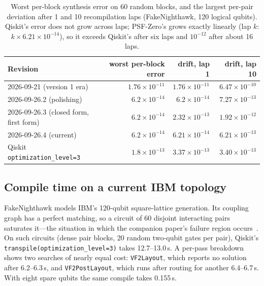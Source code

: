 \documentclass[11pt]{article}
\begin{document}
\begin{table}[h]
\centering
\begin{tabular}{lrrr}
\toprule
Revision & worst per-block error & drift, lap 1 & drift, lap 10 \\
\midrule
2026-09-21 (version 1 era) & $1.76\times10^{-11}$ & $1.76\times10^{-11}$ & $6.47\times10^{-10}$ \\
2026-09-26.2 (polishing) & $6.2\times10^{-14}$ & $6.2\times10^{-14}$ & $7.27\times10^{-13}$ \\
2026-09-26.3 (closed form, first form) & $6.2\times10^{-14}$ & $2.32\times10^{-13}$ & $1.92\times10^{-12}$ \\
2026-09-26.4 (current) & $6.2\times10^{-14}$ & $6.21\times10^{-14}$ & $6.21\times10^{-13}$ \\
Qiskit \texttt{optimization\_level=3} & $1.8\times10^{-13}$ & $3.37\times10^{-13}$ & $3.40\times10^{-13}$ \\
\bottomrule
\end{tabular}
\caption{Worst per-block synthesis error on 60 random blocks, and the
largest per-pair deviation after 1 and 10 recompilation laps (FakeNighthawk,
120 logical qubits). Qiskit's error does not grow across laps; PSF-Zero's
grows exactly linearly (lap $k$: $k\times6.21\times10^{-14}$), so it
exceeds Qiskit's after six laps and $10^{-12}$ after about 16 laps.}
\label{tab:drift}
\end{table}

\subsection{Compile time on a current IBM topology}
\label{sec:update-speed}

FakeNighthawk models IBM's 120-qubit square-lattice generation. Its
coupling graph has a perfect matching, so a circuit of 60 disjoint
interacting pairs saturates it---the situation in which the companion
paper's failure region occurs~\cite{vf2cliff}. On such circuits (dense
pair blocks, 20 random two-qubit gates per pair), Qiskit's
\texttt{transpile(optimization\_level=3)} takes 12.7--13.0\,s. A per-pass
breakdown shows two searches of nearly equal cost: \texttt{VF2Layout},
which reports no solution after 6.2--6.3\,s, and \texttt{VF2PostLayout},
which runs after routing for another 6.4--6.7\,s. With eight spare
qubits the same compile takes 0.155\,s.
\end{document}

